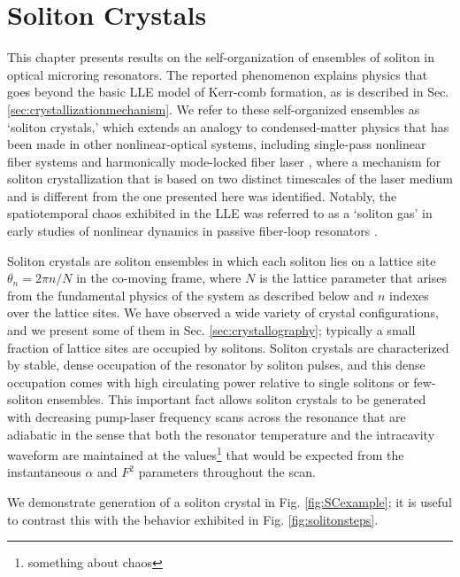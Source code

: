  \chapter{Soliton Crystals} \label{ch:SolitonCrystals}

This chapter presents results on the self-organization of ensembles of soliton in optical microring resonators. The reported phenomenon explains physics that goes beyond the basic LLE model of Kerr-comb formation, as is described in Sec. \ref{sec:crystallizationmechanism}. We refer to these self-organized ensembles as `soliton crystals,' which extends an analogy to condensed-matter physics that has been made in other nonlinear-optical systems, including single-pass nonlinear fiber systems \cite{Zajnulina2017} and harmonically mode-locked fiber laser \cite{Haboucha2008,Amrani2011a}, where a mechanism for soliton crystallization that is based on two distinct timescales of the laser medium \cite{Haboucha2008c} and is different from the one presented here was identified. Notably, the spatiotemporal chaos exhibited in the LLE was referred to as a `soliton gas' in early studies of nonlinear dynamics in passive fiber-loop resonators \cite{Malomed1998,Mitschke1998,Schwache1997}. 

Soliton crystals are soliton ensembles in which each soliton lies on a lattice site $\theta_n= 2\pi n/N$ in the co-moving frame, where $N$ is the lattice parameter that arises from the fundamental physics of the system as described below and $n$ indexes over the lattice sites. We have observed a wide variety of crystal configurations, and we present some of them in Sec. \ref{sec:crystallography}; typically a small fraction of lattice sites are occupied by solitons. Soliton crystals are characterized by stable, dense occupation of the resonator by soliton pulses, and this dense occupation comes with high circulating power relative to single solitons or few-soliton ensembles. This important fact allows soliton crystals to be generated with decreasing pump-laser frequency scans across the resonance that are adiabatic in the sense that both the resonator temperature and the intracavity waveform are maintained at the values\footnote{\color{red}something about chaos\color{black}} that would be expected from the instantaneous $\alpha$ and $F^2$ parameters throughout the scan.

We demonstrate generation of a soliton crystal in Fig. \ref{fig:SCexample}; it is useful to contrast this with the behavior exhibited in Fig. \ref{fig:solitonsteps}. 

